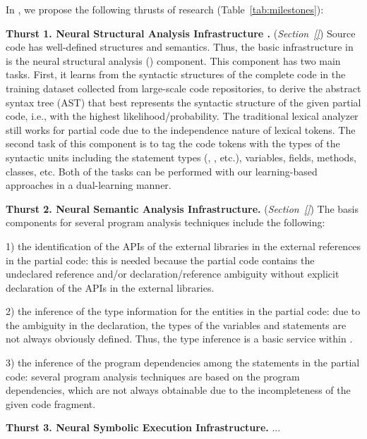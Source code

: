In {\tool}, we propose the following thrusts of research
(Table~\ref{tab:milestones}):

\vspace{3pt}
\noindent \textbf{Thurst 1. Neural Structural Analysis Infrastructure
  .} ({\em Section~\ref{}}) Source code has
well-defined structures and semantics. Thus, the basic infrastructure
in {\tool} is the neural structural analysis ()
component.  This component has two main tasks. First, it learns from
the syntactic structures of the complete code in the training dataset
collected from large-scale code repositories, to derive the abstract
syntax tree (AST) that best represents the syntactic structure of the
given partial code, i.e., with the highest likelihood/probability.
The traditional lexical analyzer still works for partial code due to
the independence nature of lexical tokens. The second task of this
component is to tag the code tokens with the types of the syntactic
units including the statement types (, , etc.),
variables, fields, methods, classes, etc. Both of the tasks can be
performed with our learning-based approaches in a dual-learning
manner.
  
\vspace{3pt}
\noindent \textbf{Thurst 2. Neural Semantic Analysis Infrastructure.}
({\em Section~\ref{}}) The basis components for several program
analysis techniques include the following:

1) the identification of the APIs of the external libraries in the
external references in the partial code: this is needed because the
partial code contains the undeclared reference and/or
declaration/reference ambiguity without explicit declaration of the
APIs in the external libraries.

2) the inference of the type information for the entities in the
partial code: due to the ambiguity in the declaration, the types of
the variables and statements are not always obviously defined. Thus,
the type inference is a basic service within {\tool}.

3) the inference of the program dependencies among the statements in
the partial code: several program analysis techniques are based on the
program dependencies, which are not always obtainable due to the
incompleteness of the given code fragment.

\vspace{3pt}
\noindent \textbf{Thurst 3. Neural Symbolic Execution Infrastructure.}
...

